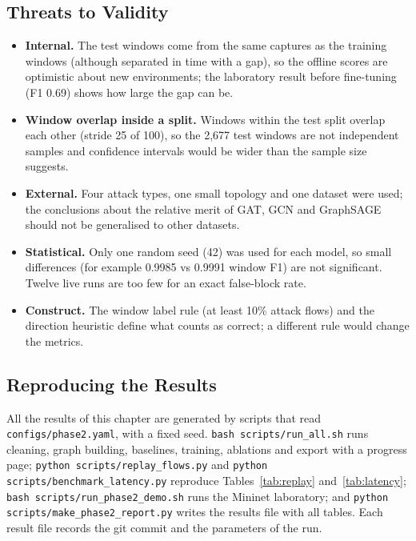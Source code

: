 \subsection{Threats to Validity}
\begin{itemize}
	\item \textbf{Internal.} The test windows come from the same captures as the training windows (although separated in time with a gap), so the offline scores are optimistic about new environments; the laboratory result before fine-tuning (F1 0.69) shows how large the gap can be.
	\item \textbf{Window overlap inside a split.} Windows within the test split overlap each other (stride 25 of 100), so the 2,677 test windows are not independent samples and confidence intervals would be wider than the sample size suggests.
	\item \textbf{External.} Four attack types, one small topology and one dataset were used; the conclusions about the relative merit of GAT, GCN and GraphSAGE should not be generalised to other datasets.
	\item \textbf{Statistical.} Only one random seed (42) was used for each model, so small differences (for example 0.9985 vs 0.9991 window F1) are not significant. Twelve live runs are too few for an exact false-block rate.
	\item \textbf{Construct.} The window label rule (at least 10\% attack flows) and the direction heuristic define what counts as correct; a different rule would change the metrics.
\end{itemize}

\subsection{Reproducing the Results}
All the results of this chapter are generated by scripts that read \texttt{configs/phase2.yaml}, with a fixed seed. \texttt{bash scripts/run\_all.sh} runs cleaning, graph building, baselines, training, ablations and export with a progress page; \texttt{python scripts/replay\_flows.py} and \texttt{python scripts/benchmark\_latency.py} reproduce Tables~\ref{tab:replay} and~\ref{tab:latency}; \texttt{bash scripts/run\_phase2\_demo.sh} runs the Mininet laboratory; and \texttt{python scripts/make\_phase2\_report.py} writes the results file with all tables. Each result file records the git commit and the parameters of the run.



